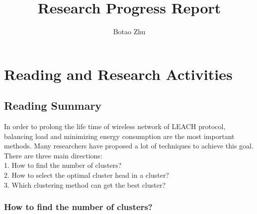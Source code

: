 \documentclass[11pt]{report}
\title{Research Progress Report}
\author{Botao Zhu}
\begin{document}
	
	\maketitle
	 \chead{} 
	 \cfoot{} 
	\renewcommand{\footrulewidth}{1.0pt}
	\renewcommand{\headrulewidth}{2.0pt}
	\renewcommand{\arraystretch}{1.3}
	\pagestyle{fancy}
	
	\renewcommand{\thesection}{\arabic{section}}
	
	\section{Reading and Research Activities}
	
	\subsection{Reading Summary}
	In order to prolong the life time of wireless network of LEACH protocol, balancing load and minimizing energy consumption are the most important methods. Many researchers have proposed a lot of techniques to achieve this goal. There are three main directions:\\
	1. How to find the number of clusters?\\
	2. How to select the optimal cluster head in a cluster?\\
	3. Which clustering method can get the best cluster? 
	
	\subsubsection{How to find the number of clusters?}
	
	\cite{1045297} 
	
\end{document}
